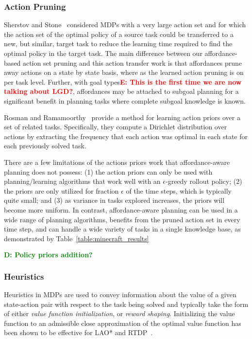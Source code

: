 \documentclass[conference]{IEEEtran}
\newcommand{\dnote}[1]{\textcolor{Green}{\textbf{D: #1}}}
\newcommand{\enote}[1]{\textcolor{Red}{\textbf{E: #1}}}
\begin{document}
\subsubsection{Action Pruning}

Sherstov and Stone~\cite{sherstov2005improving} considered MDPs with a very large 
action set and for which the action set of the optimal policy of a source task could be 
transferred to a new, but similar, target task to reduce the learning time required to find
the optimal policy in the target task. The main difference between our affordance-based 
action set pruning and this action transfer work is that affordances prune away actions on 
a state by state basis, where as the learned action pruning is on per task level. Further, 
with goal types\enote{This is the first time we are now talking about LGD?}, affordances may be attached to subgoal planning for a significant
benefit in planning tasks where complete subgoal knowledge is known.

Rosman and Ramamoorthy~\cite{rosman2012good} provide a method for learning action
priors over a set of related tasks. Specifically, they compute a Dirichlet distribution over 
actions by extracting the frequency that each action was optimal in each state for each 
previously solved task.

There are a few limitations of the actions priors work that affordance-aware planning
does not possess: (1) the action priors can only be used with planning/learning algorithms
that work well with an $\epsilon$-greedy rollout policy; (2) the priors are only utilized for 
fraction $\epsilon$ of the time steps, which is typically quite small; and (3) as variance in
tasks explored increases, the priors will become more uniform. In contrast, affordance-aware
planning can be used in a wide range of planning algorithms, benefits from the pruned action
set in every time step, and can handle a wide variety of tasks in a single knowledge base,
as demonstrated by Table~\ref{table:minecraft_results}

\dnote{Policy priors addition?}

\subsubsection{Heuristics}
Heuristics in MDPs are used to convey information about the value of a given state-action
pair with respect to the task being solved and typically take the form of either {\em value function initialization},
or {\em reward shaping}. Initializing the value function to an admissible close approximation of the optimal
value function has been shown to be effective for LAO* and RTDP~\cite{Hansen:1999qf}.
\end{document}
